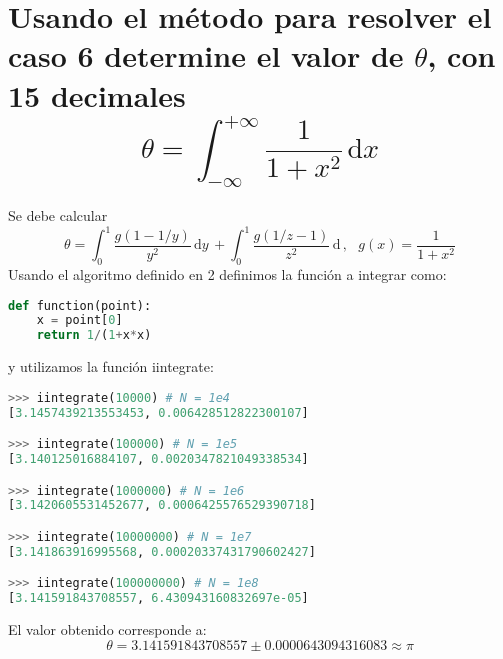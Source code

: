 \documentclass[letter, 10pt]{article}
\begin{document}
\section{Usando el m\'etodo para resolver el caso 6 determine el valor de $\theta$, con 15 decimales
$$\theta = \int_{-\infty}^{+\infty} \! \frac{1}{1+x^2} \, \mathrm{d} x $$}
Se debe calcular
$$\theta = \int_0^1 \! \frac{g(1 - 1/y)}{y^2} \, \mathrm{d} y \, + \int_{0}^{1} \! \frac{g(1/z - 1)}{z^2} \, \mathrm{d} \,, \,\,\,\, g(x) = \frac{1}{1+x^2}$$
Usando el algoritmo definido en 2 definimos la funci\'on a integrar como:\begin{lstlisting}[language=Python]
def function(point):
    x = point[0]
    return 1/(1+x*x)
\end{lstlisting}
y utilizamos la funci\'on iintegrate:
\begin{lstlisting}[language=Python]
>>> iintegrate(10000) # N = 1e4
[3.1457439213553453, 0.006428512822300107]

>>> iintegrate(100000) # N = 1e5
[3.140125016884107, 0.0020347821049338534]

>>> iintegrate(1000000) # N = 1e6
[3.1420605531452677, 0.0006425576529390718]

>>> iintegrate(10000000) # N = 1e7
[3.141863916995568, 0.00020337431790602427]

>>> iintegrate(100000000) # N = 1e8
[3.141591843708557, 6.430943160832697e-05]

\end{lstlisting}
El valor obtenido corresponde a:
$$\theta = 3.141591843708557 \pm 0.0000643094316083	 \approx \pi$$
\end{document}
